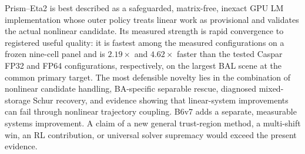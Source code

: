 \documentclass[10pt]{article}
\begin{document}
Prism--Eta2 is best described as a safeguarded, matrix-free, inexact GPU LM implementation whose outer policy treats linear work as provisional and validates the actual nonlinear candidate.  Its measured strength is rapid convergence to registered useful quality: it is fastest among the measured configurations on a frozen nine-cell panel and is $2.19\times$ and $4.62\times$ faster than the tested Caspar FP32 and FP64 configurations, respectively, on the largest BAL scene at the common primary target.  The most defensible novelty lies in the combination of nonlinear candidate handling, BA-specific separable rescue, diagnosed mixed-storage Schur recovery, and evidence showing that linear-system improvements can fail through nonlinear trajectory coupling.  B6v7 adds a separate, measurable systems improvement.  A claim of a new general trust-region method, a multi-shift win, an RL contribution, or universal solver supremacy would exceed the present evidence.
\end{document}
